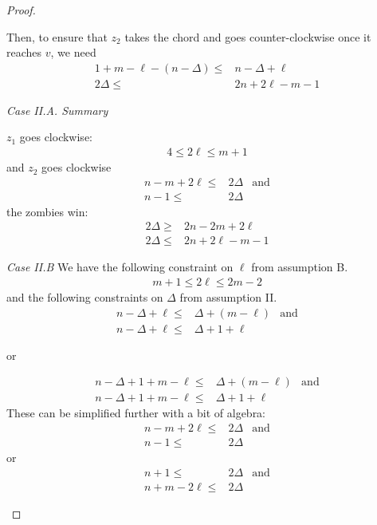 \begin{proof}
\begin{proofpart}
  Then, to ensure that $z_2$ takes the chord and goes counter-clockwise once
  it reaches $v$, we need
  \begin{align*}
   1 + m - \ell - (n - \Delta) \leq & n - \Delta + \ell  \\
   2 \Delta \leq                    & 2n + 2\ell - m - 1
  \end{align*}

  \textit{Case II.A. Summary}

  $z_1$ goes clockwise:
  \begin{align*}
   4 \leq 2 \ell \leq m + 1
  \end{align*}
  and $z_2$ goes clockwise
  \begin{align*}
   n -m + 2\ell \leq & 2 \Delta & \text{and} \\
   n-1 \leq          & 2 \Delta
  \end{align*}
  the zombies win:
  \begin{align*}
   2 \Delta \geq & 2n - 2m + 2\ell    \\
   2 \Delta \leq & 2n + 2\ell - m - 1
  \end{align*}

  \textit{Case II.B}  We have the following constraint on $\ell$ from
  assumption B.
  \begin{align*}
   m + 1 \leq 2 \ell \leq 2m - 2
  \end{align*}
  and the following constraints on $\Delta$ from assumption II.
  \begin{align*}
   n - \Delta + \ell \leq & \Delta + (m - \ell) & \text{and} \\
   n - \Delta + \ell \leq & \Delta + 1 + \ell
  \end{align*}
  \begin{center}or\end{center}
  \begin{align*}
   n - \Delta + 1 + m - \ell \leq & \Delta + (m - \ell) & \text{and} \\
   n - \Delta + 1 + m - \ell \leq & \Delta + 1 + \ell
  \end{align*}
  These can be simplified further with a bit of algebra:
  \begin{align*}
   n-m+2\ell \leq & 2 \Delta & \text{and} \\
   n-1 \leq       & 2\Delta
  \end{align*}
  or
  \begin{align*}
   n+1 \leq        & 2 \Delta & \text{and} \\
   n+m-2\ell  \leq & 2 \Delta
  \end{align*}


\end{proofpart}
\end{proof}
